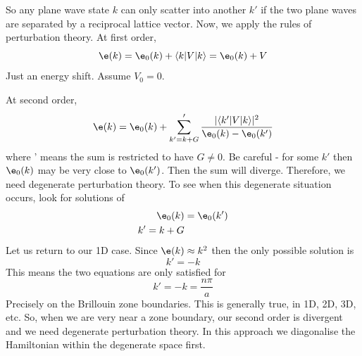 \documentclass[a4paper, 11pt, normalem]{report}
\begin{document}
So any plane wave state $k$ can only scatter into another $k'$ if the two plane waves are separated by a reciprocal lattice vector.
Now, we apply the rules of perturbation theory. 
At first order, 
\begin{equation} 
    \e(k) = \e_0(k) + \langle k|V|k\rangle = \e_0(k) + V
\end{equation}
Just an energy shift. Assume $V_0 = 0$.

At second order, 
\begin{equation}
    \e(k) = \e_0(k) + \sum_{k'=k+G}' \frac{|\langle k'|V|k\rangle|^2}{\e_0(k) - \e_0(k')}
\end{equation}
where ' means the sum is restricted to have $G\neq 0$.
Be careful - for some $k'$ then $\e_0(k)$ may be very close to $\e_0(k')$. 
Then the sum will diverge. 
Therefore, we need degenerate perturbation theory. 
To see when this degenerate situation occurs, look for solutions of
\begin{align}
    \e_0(k) &= \e_0(k') \\
    k' = k+G
\end{align}
Let us return to our 1D case. 
Since $\e(k) \approx k^2$ then the only possible solution is 
\begin{equation}
    k' = -k
\end{equation}
This means the two equations are only satisfied for 
\begin{equation} 
    k' = -k = \frac{n\pi}{a} 
\end{equation}
Precisely on the Brillouin zone boundaries. 
This is generally true, in 1D, 2D, 3D, etc. 
So, when we are very near a zone boundary, our second order is divergent and we need degenerate perturbation theory. 
In this approach we diagonalise the Hamiltonian within the degenerate space first.
\end{document}
